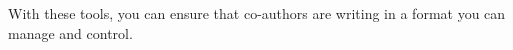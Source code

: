 With these tools, you can ensure that co-authors are writing
in a format you can manage and control.\cite{flom2005latex}
